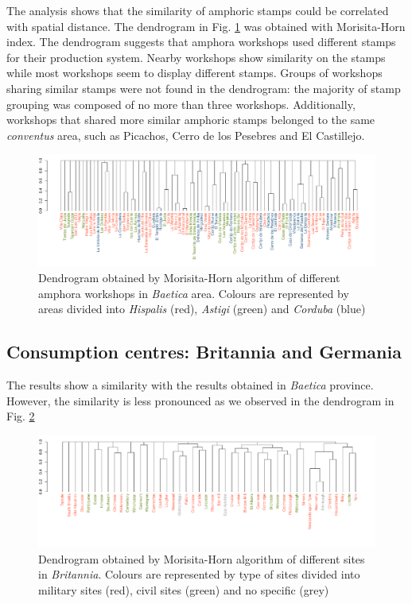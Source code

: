 \documentclass[review]{elsarticle}
\newcommand{\memo}[2]{\textcolor{#1}{#2}}
\newcommand{\xavi}[1]{\memo{magenta}{XRC: #1\\}}
\begin{document}
The analysis shows that the similarity of amphoric stamps could be correlated with spatial distance. The dendrogram in Fig. \ref{dendro} was obtained with Morisita-Horn index. The dendrogram suggests that amphora workshops used different stamps for their production system. Nearby workshops show similarity on the stamps while most workshops seem to display different stamps. Groups of workshops sharing similar stamps were not found in the dendrogram: the majority of stamp grouping was composed of no more than three workshops. Additionally, workshops that shared more similar amphoric stamps belonged to the same \textit{conventus} area, such as Picachos, Cerro de los Pesebres and El Castillejo. 

\begin{figure}
	\centering
\includegraphics[angle=180, width=\linewidth]{figs/dendro}
\caption{Dendrogram obtained by Morisita-Horn algorithm of different amphora workshops in \textit{Baetica} area. Colours are represented by areas divided into \textit{Hispalis} (red), \textit{Astigi} (green) and \textit{Corduba} (blue)}
\label{dendro}
\end{figure} 


\subsection{Consumption centres: Britannia and Germania}


The results show a similarity with the results obtained in \textit{Baetica} province. However, the similarity is less pronounced as we observed in the dendrogram in Fig. \ref{britmap}


\begin{figure}
	\centering
\includegraphics[angle=180,width=\linewidth]{figs/dendrobrit5.pdf}
\caption{Dendrogram obtained by Morisita-Horn algorithm of different sites in \textit{Britannia}. Colours are represented by type of sites divided into military sites (red), civil sites (green) and no specific (grey)}
\label{britmap}
\end{figure}
\end{document}
